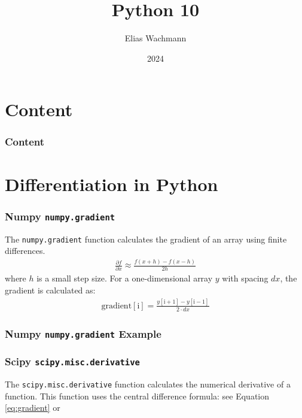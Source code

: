 \documentclass{beamer}
\title[]
{Python 10}
\author[E.~Wachmann]{\scriptsize Elias Wachmann
}
\date{2024} %
\institute[Institute of Theoretical and Computational Physics]
{
}
\begin{document}
\titleframe


\section*{Content}

\begin{frame}
\frametitle{Content}
  \tableofcontents
\end{frame}


\section{Differentiation in Python}
\begin{frame}
    \frametitle{Numpy \texttt{numpy.gradient}}
    The \texttt{numpy.gradient} function calculates the gradient of an array using finite differences.
    \begin{align}
        \label{eq:gradient}
      \frac{\partial f}{\partial x} \approx \frac{f(x + h) - f(x - h)}{2h}
    \end{align}
    where \( h \) is a small step size. For a one-dimensional array \( y \) with spacing \( dx \), the gradient is calculated as:
    \begin{align}
      \text{gradient}[\text{i}] = \frac{y[\text{i}+1] - y[\text{i}-1]}{2 \cdot dx}
    \end{align}
\end{frame}

\begin{frame}
  \frametitle{Numpy \texttt{numpy.gradient} Example}
  
\end{frame}

\begin{frame}
  \frametitle{Scipy \texttt{scipy.misc.derivative}}
  The \texttt{scipy.misc.derivative} function calculates the numerical derivative of a function.
  This function uses the central difference formula:
  see Equation \ref{eq:gradient} or 
  
\end{frame}
\end{document}
